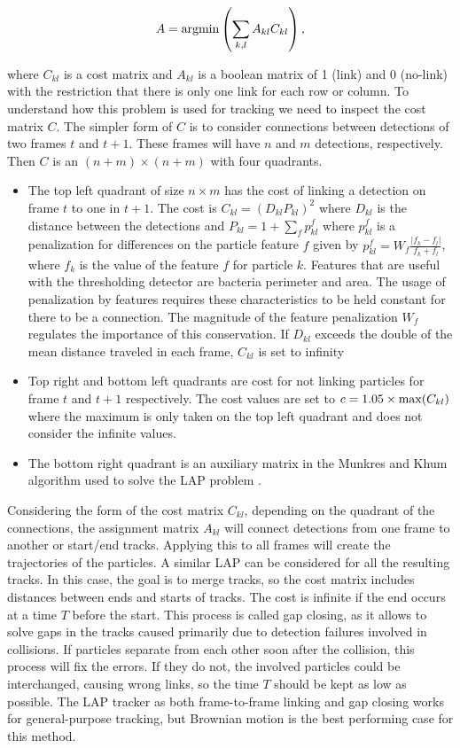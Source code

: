 \begin{equation}
  A = {\rm argmin} \left(  \sum_{k,l} A_{kl}C_{kl} \right),
\end{equation}

where $C_{kl}$ is a cost matrix and $A_{kl}$ is a boolean matrix of 1 (link) and 0 (no-link) with the restriction that there is only one link for each row or column. To understand how this problem is used for tracking we need to inspect the cost matrix $C$. The simpler form of $C$ is to consider connections between detections of two frames $t$ and $t+1$. These frames will have $n$ and $m$ detections, respectively. Then $C$ is an $(n+m) \times (n+m)$ with four quadrants. 

\begin{itemize}
	\item The top left quadrant of size $n \times m$ has the cost of linking a detection on frame $t$ to one in $t+1$. The cost is $C_{kl} = (D_{kl}P_{kl})^2$ where $D_{kl}$ is the distance between the detections and $P_{kl} = 1 + \sum_f p_{kl}^f$ where $p_{kl}^f$ is a penalization for differences on the particle feature $f$ given by $p_{kl}^f = W_f \frac{|f_k - f_l|}{f_k + f_l}$, where $f_k$ is the value of the feature $f$ for particle $k$. Features that are useful with the thresholding detector are bacteria perimeter and area. The usage of penalization by features requires these characteristics to be held constant for there to be a connection. The magnitude of the feature penalization $W_f$ regulates the importance of this conservation. If $D_{kl}$ exceeds the double of the mean distance traveled in each frame, $C_{kl}$ is set to infinity
	\item Top right and bottom left quadrants are cost for not linking particles for frame $t$ and $t+1$ respectively. The cost values are set to $c = 1.05 \times {\rm max}(C_{kl})$ where the maximum is only taken on the top left quadrant and does not consider the infinite values.
	\item The bottom right quadrant is an auxiliary matrix in the Munkres and Khum algorithm used to solve the LAP problem \cite{Munkres1957AlgorithmsProblems}.
\end{itemize}

Considering the form of the cost matrix $C_{kl}$, depending on the quadrant of the connections, the assignment matrix $A_{kl}$ will connect detections from one frame to another or start/end tracks. Applying this to all frames will create the trajectories of the particles. A similar LAP can be considered for all the resulting tracks. In this case, the goal is to merge tracks, so the cost matrix includes distances between ends and starts of tracks. The cost is infinite if the end occurs at a time $T$ before the start. This process is called gap closing, as it allows to solve gaps in the tracks caused primarily due to detection failures involved in collisions. If particles separate from each other soon after the collision, this process will fix the errors. If they do not, the involved particles could be interchanged, causing wrong links, so the time $T$ should be kept as low as possible.  The LAP tracker as both frame-to-frame linking and gap closing works for general-purpose tracking, but Brownian motion is the best performing case for this method.

